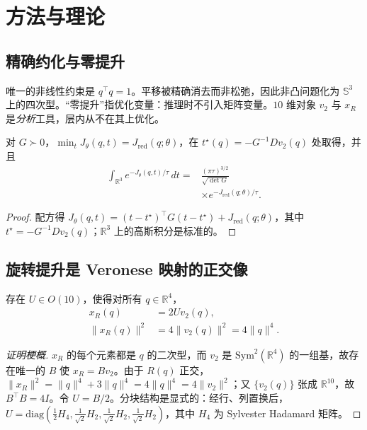 \section{方法与理论}\label{sec:method}

\subsection{精确约化与零提升}\label{sec:reduction}

唯一的非线性约束是 $q^\top q=1$。平移被精确消去而非松弛，因此非凸问题化为 $\mathbb{S}^3$ 上的四次型。“零提升”指优化变量：推理时不引入矩阵变量。$10$ 维对象 $v_2$ 与 $x_R$ 是\emph{分析}工具，层内从不在其上优化。

\begin{lemma}[平移的精确消去]\label{lem:translation}
对 $G\succ0$，$\min_t J_\theta(q,t)=J_{\mathrm{red}}(q;\theta)$，在 $t^\star(q)=-G^{-1}Dv_2(q)$ 处取得，并且
\begin{equation}
\begin{split}
\int_{\mathbb{R}^3}e^{-J_\theta(q,t)/\tau}\,dt={}&\frac{(\pi\tau)^{3/2}}{\sqrt{\det G}}\\
&\times e^{-J_{\mathrm{red}}(q;\theta)/\tau}.
\end{split}
\label{eq:gaussint}
\end{equation}
\end{lemma}

\begin{proof}
配方得 $J_\theta(q,t)=(t-t^\star)^\top G(t-t^\star)+J_{\mathrm{red}}(q;\theta)$，其中 $t^\star=-G^{-1}Dv_2(q)$；$\mathbb{R}^3$ 上的高斯积分是标准的。
\end{proof}

\subsection{旋转提升是 Veronese 映射的正交像}\label{sec:lift}

\begin{theorem}\label{thm:lift}
存在 $U\in O(10)$，使得对所有 $q\in\mathbb{R}^4$，
\begin{equation}
\begin{split}
x_R(q)&=2Uv_2(q),\\
\|x_R(q)\|^2&=4\|v_2(q)\|^2=4\|q\|^4 .
\end{split}
\label{eq:bridge}
\end{equation}
\end{theorem}

\begin{proof}[证明梗概]
$x_R$ 的每个元素都是 $q$ 的二次型，而 $v_2$ 是 $\mathrm{Sym}^2(\mathbb{R}^4)$ 的一组基，故存在唯一的 $B$ 使 $x_R=Bv_2$。由于 $R(q)$ 正交，$\|x_R\|^2=\|q\|^4+3\|q\|^4=4\|q\|^4=4\|v_2\|^2$；又 $\{v_2(q)\}$ 张成 $\mathbb{R}^{10}$，故 $B^\top B=4I$。令 $U=B/2$。分块结构是显式的：经行、列置换后，$U=\mathrm{diag}(\tfrac12H_4,\tfrac1{\sqrt2}H_2,\tfrac1{\sqrt2}H_2,\tfrac1{\sqrt2}H_2)$，其中 $H_4$ 为 Sylvester Hadamard 矩阵。
\end{proof}

